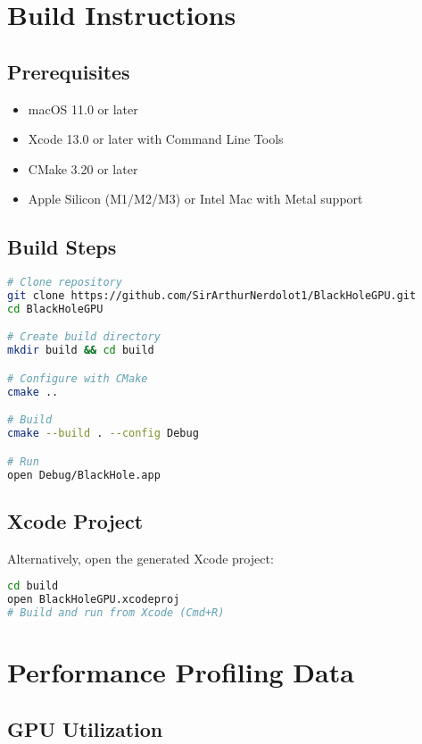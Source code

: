 \documentclass[12pt,a4paper]{article}
\theoremstyle{definition}
\theoremstyle{remark}
\begin{document}
\section{Build Instructions}

\subsection{Prerequisites}

\begin{itemize}
    \item macOS 11.0 or later
    \item Xcode 13.0 or later with Command Line Tools
    \item CMake 3.20 or later
    \item Apple Silicon (M1/M2/M3) or Intel Mac with Metal support
\end{itemize}

\subsection{Build Steps}

\begin{lstlisting}[language=bash, caption=CMake build process]
# Clone repository
git clone https://github.com/SirArthurNerdolot1/BlackHoleGPU.git
cd BlackHoleGPU

# Create build directory
mkdir build && cd build

# Configure with CMake
cmake ..

# Build
cmake --build . --config Debug

# Run
open Debug/BlackHole.app
\end{lstlisting}

\subsection{Xcode Project}

Alternatively, open the generated Xcode project:

\begin{lstlisting}[language=bash]
cd build
open BlackHoleGPU.xcodeproj
# Build and run from Xcode (Cmd+R)
\end{lstlisting}

\section{Performance Profiling Data}

\subsection{GPU Utilization}
\end{document}
